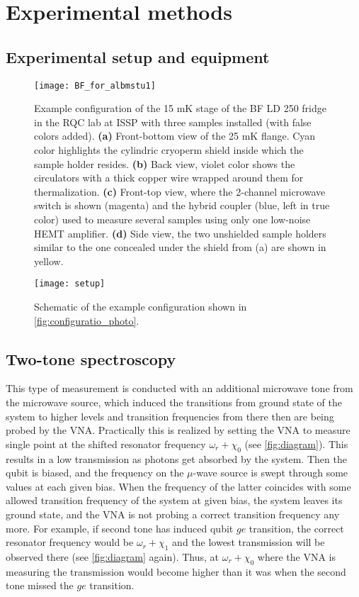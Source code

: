 \chapter{Experimental methods}

\section{Experimental setup and equipment}


\begin{figure}[h!]
\centering
\texttt{[image: BF\_for\_albmstu1]}
\caption{Example configuration of the 15 mK stage of the BF LD 250 fridge in the RQC lab at ISSP with three samples installed (with false colors added). \textbf{(a)} Front-bottom view of the 25 mK flange. Cyan color highlights the cylindric cryoperm shield inside which the sample holder resides. \textbf{(b)} Back view, violet color shows the circulators with  a thick copper wire wrapped around them for thermalization. \textbf{(c)} Front-top view, where the 2-channel  microwave switch is shown (magenta) and the hybrid coupler (blue, left in true color) used to measure several samples using only one low-noise HEMT amplifier. \textbf{(d)} Side view, the two unshielded sample holders similar to the one concealed under the shield from (a) are shown in yellow.}
\label{fig:configuratio_photo}
\end{figure}

\begin{figure}[h!]
\centering
\texttt{[image: setup]}
\caption{Schematic of the example configuration shown in \autoref{fig:configuratio_photo}.}
\end{figure}

\section{Two-tone spectroscopy}
\label{sec:2tone}

This type of measurement is conducted with an additional microwave tone from the microwave source, which induced the transitions from ground state of the system to higher levels and transition frequencies from there then are being probed by the VNA. Practically this is realized by setting the VNA to measure single point at the shifted resonator  frequency $\omega_r + \chi_0$ (see \autoref{fig:diagram}). This results in a low transmission as photons get absorbed by the system. Then the qubit is biased, and the frequency on the $\mu$-wave source is swept through some values at each given bias. When the frequency of the latter coincides with some allowed transition frequency of the system at given bias, the system leaves its ground state, and the VNA is not probing a correct transition frequency any more. For example, if second tone has induced qubit $ge$ transition, the correct resonator frequency would be $\omega_r + \chi_1$ and the lowest transmission will be observed there (see \autoref{fig:diagram} again). Thus, at $\omega_r + \chi_0$ where the VNA is measuring the transmission would become higher than it was when the second tone missed the $ge$ transition. 

